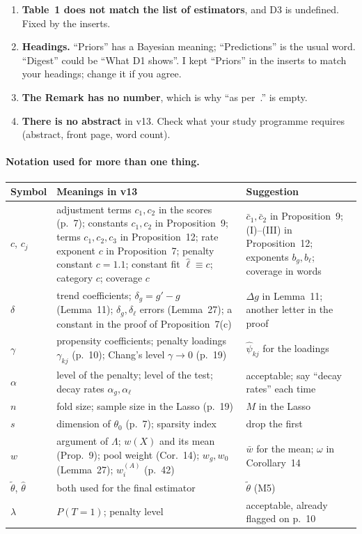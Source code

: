 \documentclass[11pt]{article}
\theoremstyle{plain}
\theoremstyle{remark}
\begin{document}
\begin{enumerate}
  D4 has a fixed number of categories, so asymptotically the Lasso would select
  every relevant dummy; D4 is about what happens before that. Result~3 of D4
  says so; keep that sentence.
\item \textbf{Table~1 does not match the list of estimators}, and D3 is
  undefined. Fixed by the inserts.
\item \textbf{Headings.} ``Priors'' has a Bayesian meaning; ``Predictions'' is the
  usual word. ``Digest'' could be ``What D1 shows''. I kept ``Priors'' in the
  inserts to match your headings; change it if you agree.
\item \textbf{The Remark has no number}, which is why ``as per~.'' is empty.
\item \textbf{There is no abstract} in v13. Check what your study programme
  requires (abstract, front page, word count).
\end{enumerate}

\paragraph{Notation used for more than one thing.}
\begin{center}\small
\begin{tabular}{p{}p{}p{}}
\toprule
Symbol & Meanings in v13 & Suggestion\\
\midrule
$c$, $c_j$ & adjustment terms $c_1,c_2$ in the scores (p.~7); constants
  $c_1,c_2$ in Proposition~9; terms $c_1,c_2,c_3$ in Proposition~12; rate
  exponent $c$ in Proposition~7; penalty constant $c=1.1$; constant fit
  $\hat\ell\equiv c$; category $c$; coverage $c$ & $\bar c_1,\bar c_2$ in
  Proposition~9; (I)--(III) in Proposition~12; exponents $b_g,b_\ell$; coverage
  in words\\
$\delta$ & trend coefficients; $\delta_g=g'-g$ (Lemma~11); $\delta_g,\delta_\ell$
  errors (Lemma~27); a constant in the proof of Proposition~7(c) & $\Delta g$ in
  Lemma~11; another letter in the proof\\
$\gamma$ & propensity coefficients; penalty loadings $\gamma_{kj}$ (p.~10);
  Chang's level $\gamma\to0$ (p.~19) & $\hat\psi_{kj}$ for the loadings\\
$\alpha$ & level of the penalty; level of the test; decay rates
  $\alpha_g,\alpha_\ell$ & acceptable; say ``decay rates'' each time\\
$n$ & fold size; sample size in the Lasso (p.~19) & $M$ in the Lasso\\
$s$ & dimension of $\theta_0$ (p.~7); sparsity index & drop the first\\
$w$ & argument of $\Lambda$; $w(X)$ and its mean (Prop.~9); pool weight
  (Cor.~14); $w_g,w_0$ (Lemma~27); $w_i^{(A)}$ (p.~42) & $\bar w$ for the mean;
  $\omega$ in Corollary~14\\
$\tilde\theta$, $\hat\theta$ & both used for the final estimator & $\tilde\theta$
  (M5)\\
$\lambda$ & $P(T=1)$; penalty level & acceptable, already flagged on p.~10\\
\bottomrule
\end{tabular}
\end{center}
\end{document}
